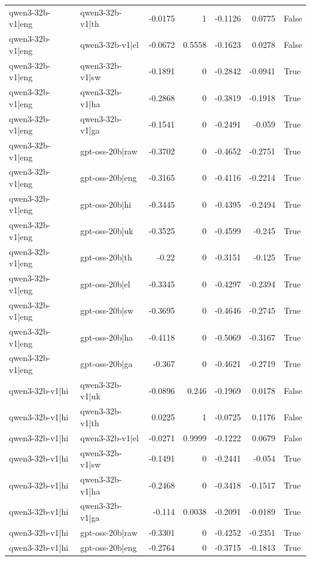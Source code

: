 \begin{table}
\begin{tabular}{l l r r r r l}
qwen3-32b-v1|eng & qwen3-32b-v1|th & -0.0175 & 1 & -0.1126 & 0.0775 & False \\
qwen3-32b-v1|eng & qwen3-32b-v1|el & -0.0672 & 0.5558 & -0.1623 & 0.0278 & False \\
qwen3-32b-v1|eng & qwen3-32b-v1|sw & -0.1891 & 0 & -0.2842 & -0.0941 & True \\
qwen3-32b-v1|eng & qwen3-32b-v1|ha & -0.2868 & 0 & -0.3819 & -0.1918 & True \\
qwen3-32b-v1|eng & qwen3-32b-v1|ga & -0.1541 & 0 & -0.2491 & -0.059 & True \\
qwen3-32b-v1|eng & gpt-oss-20b|raw & -0.3702 & 0 & -0.4652 & -0.2751 & True \\
qwen3-32b-v1|eng & gpt-oss-20b|eng & -0.3165 & 0 & -0.4116 & -0.2214 & True \\
qwen3-32b-v1|eng & gpt-oss-20b|hi & -0.3445 & 0 & -0.4395 & -0.2494 & True \\
qwen3-32b-v1|eng & gpt-oss-20b|uk & -0.3525 & 0 & -0.4599 & -0.245 & True \\
qwen3-32b-v1|eng & gpt-oss-20b|th & -0.22 & 0 & -0.3151 & -0.125 & True \\
qwen3-32b-v1|eng & gpt-oss-20b|el & -0.3345 & 0 & -0.4297 & -0.2394 & True \\
qwen3-32b-v1|eng & gpt-oss-20b|sw & -0.3695 & 0 & -0.4646 & -0.2745 & True \\
qwen3-32b-v1|eng & gpt-oss-20b|ha & -0.4118 & 0 & -0.5069 & -0.3167 & True \\
qwen3-32b-v1|eng & gpt-oss-20b|ga & -0.367 & 0 & -0.4621 & -0.2719 & True \\
qwen3-32b-v1|hi & qwen3-32b-v1|uk & -0.0896 & 0.246 & -0.1969 & 0.0178 & False \\
qwen3-32b-v1|hi & qwen3-32b-v1|th & 0.0225 & 1 & -0.0725 & 0.1176 & False \\
qwen3-32b-v1|hi & qwen3-32b-v1|el & -0.0271 & 0.9999 & -0.1222 & 0.0679 & False \\
qwen3-32b-v1|hi & qwen3-32b-v1|sw & -0.1491 & 0 & -0.2441 & -0.054 & True \\
qwen3-32b-v1|hi & qwen3-32b-v1|ha & -0.2468 & 0 & -0.3418 & -0.1517 & True \\
qwen3-32b-v1|hi & qwen3-32b-v1|ga & -0.114 & 0.0038 & -0.2091 & -0.0189 & True \\
qwen3-32b-v1|hi & gpt-oss-20b|raw & -0.3301 & 0 & -0.4252 & -0.2351 & True \\
qwen3-32b-v1|hi & gpt-oss-20b|eng & -0.2764 & 0 & -0.3715 & -0.1813 & True \\

\end{tabular}
\end{table}
